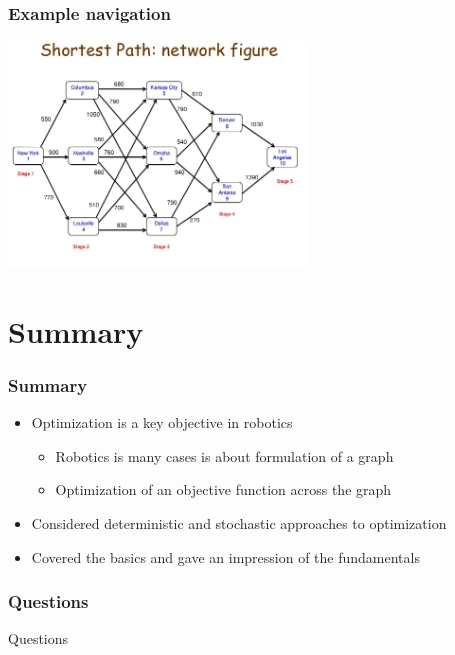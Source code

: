 \documentclass[10pt]{beamer}
\begin{document}
\begin{frame}
  \frametitle{Example navigation}
  \centerline{\includegraphics[height=6cm]{dynamic-programming-2}}
\end{frame}

\section{Summary}

\begin{frame}
  \frametitle{Summary}
  \begin{itemize}
  \item Optimization is a key objective in robotics
    \begin{itemize}
    \item Robotics is many cases is about formulation of a graph
    \item Optimization of an objective function across the graph
    \end{itemize}
  \item Considered deterministic and stochastic approaches to
    optimization
  \item Covered the basics and gave an impression of the fundamentals
  \end{itemize}
\end{frame}

\begin{frame}
  \frametitle{Questions}
  \centerline{\Huge Questions}
\end{frame}
\end{document}
